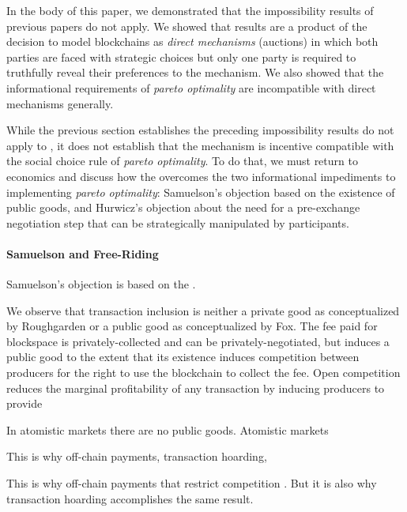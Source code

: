 

In the body of this paper, we demonstrated that the impossibility results of previous papers do not apply. We showed that results are a product of the decision to model blockchains as \textit{direct mechanisms} (auctions) in which both parties are faced with strategic choices but only one party is required to truthfully reveal their preferences to the mechanism. We also showed that the informational requirements of \textit{pareto optimality} are incompatible with direct mechanisms generally.

While the previous section establishes the preceding impossibility results do not apply to \ourTFM, it does not establish that the mechanism is incentive compatible with the social choice rule of \textit{pareto optimality}. To do that, we must return to economics and discuss how the \ourTFM overcomes the two informational impediments to implementing \textit{pareto optimality}: Samuelson's objection based on the existence of public goods, and Hurwicz's objection about the need for a pre-exchange negotiation step that can be strategically manipulated by participants.

\paragraph{Samuelson and Free-Riding}

Samuelson's objection is based on the .



We observe that transaction inclusion is neither a private good as conceptualized by Roughgarden or a public good as conceptualized by Fox. The fee paid for blockspace is privately-collected and can be privately-negotiated, but induces a public good to the extent that its existence induces competition between producers for the right to use the blockchain to collect the fee. Open competition reduces the marginal profitability of any transaction by inducing producers to provide

In atomistic markets there are no public goods.
Atomistic markets 

This is why off-chain payments, transaction hoarding, 


This is why off-chain payments that restrict competition . But it is also why transaction hoarding accomplishes the same result.














